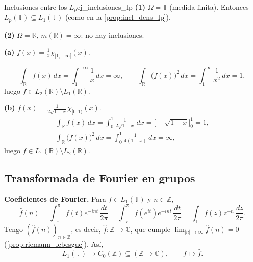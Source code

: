 \begin{ejemplo}{Inclusiones entre los $L_p$}{ej_inclusiones_lp}
\textbf{(1)} $\Omega = \mathbb{T}$ (medida finita). Entonces $L_p(\mathbb{T}) \subseteq L_1(\mathbb{T})$ (como en la \cref{prop:incl_dens_lp}).

\textbf{(2)} $\Omega = \mathbb{R}$, $m(\mathbb{R}) = \infty$: no hay inclusiones.

\textbf{(a)} $f(x) = \frac{1}{x}\chi_{[1,+\infty[}(x)$.
\begin{center}
\end{center}
\[
\int_{\mathbb{R}}f(x)\,dx = \int_1^{+\infty}\frac{1}{x}\,dx = \infty, \qquad \int_{\mathbb{R}}\big(f(x)\big)^2\,dx = \int_1^{\infty}\frac{1}{x^2}\,dx = 1,
\]
luego $f \in L_2(\mathbb{R}) \setminus L_1(\mathbb{R})$.

\textbf{(b)} $f(x) = \frac{1}{2\sqrt{1-x}}\chi_{[0,1)}(x)$.
\begin{gather*}
\int_{\mathbb{R}}f(x)\,dx = \int_0^1\frac{1}{2\sqrt{1-x}}\,dx = \Big[-\sqrt{1-x}\Big]_0^1 = 1, \\
\int_{\mathbb{R}}\big(f(x)\big)^2\,dx = \int_0^1\frac{1}{4(1-x)}\,dx = \infty,
\end{gather*}
luego $f \in L_1(\mathbb{R}) \setminus L_2(\mathbb{R})$.
\end{ejemplo}

\subsection{Transformada de Fourier en grupos}

\textbf{Coeficientes de Fourier.} Para $f \in L_1(\mathbb{T})$ y $n \in \mathbb{Z}$,
\[
\hat{f}(n) = \int_{-\pi}^{\pi}f(t)e^{-int}\,\frac{dt}{2\pi} = \int_{-\pi}^{\pi}f(e^{it})e^{-int}\,\frac{dt}{2\pi} = \int_{\mathbb{T}}f(z)z^{-n}\,\frac{dz}{2\pi}.
\]
Tengo $(\hat{f}(n))_{n\in\mathbb{Z}}$, es decir, $\hat{f} : \mathbb{Z} \to \mathbb{C}$, que cumple $\lim_{|n|\to\infty}\hat{f}(n) = 0$ (\cref{prop:riemann_lebesgue}). Así,
\[
L_1(\mathbb{T}) \longrightarrow C_0(\mathbb{Z}) \subseteq (\mathbb{Z} \to \mathbb{C}), \qquad f \longmapsto \hat{f}.
\]

